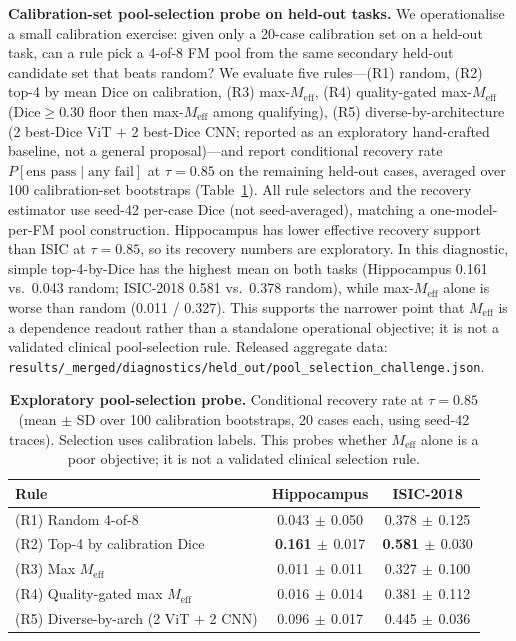 \textbf{Calibration-set pool-selection probe on held-out tasks.} We operationalise a small calibration exercise: given only a 20-case calibration set on a held-out task, can a rule pick a 4-of-8 FM pool from the same secondary held-out candidate set that beats random? We evaluate five rules---(R1) random, (R2) top-4 by mean Dice on calibration, (R3) max-$M_{\mathrm{eff}}$, (R4) quality-gated max-$M_{\mathrm{eff}}$ (Dice${\geq}0.30$ floor then max-$M_{\mathrm{eff}}$ among qualifying), (R5) diverse-by-architecture (2 best-Dice ViT $+$ 2 best-Dice CNN; reported as an exploratory hand-crafted baseline, not a general proposal)---and report conditional recovery rate $P[\text{ens pass}\mid\text{any fail}]$ at $\tau{=}0.85$ on the remaining held-out cases, averaged over 100 calibration-set bootstraps (Table~\ref{tab:pool-challenge}). All rule selectors and the recovery estimator use seed-42 per-case Dice (not seed-averaged), matching a one-model-per-FM pool construction. Hippocampus has lower effective recovery support than ISIC at $\tau{=}0.85$, so its recovery numbers are exploratory. In this diagnostic, simple top-4-by-Dice has the highest mean on both tasks (Hippocampus 0.161 vs.\ 0.043 random; ISIC-2018 0.581 vs.\ 0.378 random), while max-$M_{\mathrm{eff}}$ alone is worse than random (0.011 / 0.327). This supports the narrower point that $M_{\mathrm{eff}}$ is a dependence readout rather than a standalone operational objective; it is not a validated clinical pool-selection rule. Released aggregate data: \texttt{results/\_merged/diagnostics/held\_out/pool\_selection\_challenge.json}.

\begin{table}[!htbp]
  \caption{\textbf{Exploratory pool-selection probe.} Conditional recovery rate at $\tau{=}0.85$ (mean $\pm$ SD over 100 calibration bootstraps, 20 cases each, using seed-42 traces). Selection uses calibration labels. This probes whether $M_{\mathrm{eff}}$ alone is a poor objective; it is not a validated clinical selection rule.}
  \label{tab:pool-challenge}
  \centering\small
  \begin{tabular}{lcc}
    \toprule
    Rule & Hippocampus & ISIC-2018 \\
    \midrule
    (R1) Random 4-of-8                        & 0.043$\,\pm\,$0.050 & 0.378$\,\pm\,$0.125 \\
    (R2) Top-4 by calibration Dice            & \textbf{0.161}$\,\pm\,$0.017 & \textbf{0.581}$\,\pm\,$0.030 \\
    (R3) Max $M_{\mathrm{eff}}$                 & 0.011$\,\pm\,$0.011 & 0.327$\,\pm\,$0.100 \\
    (R4) Quality-gated max $M_{\mathrm{eff}}$   & 0.016$\,\pm\,$0.014 & 0.381$\,\pm\,$0.112 \\
    (R5) Diverse-by-arch (2 ViT $+$ 2 CNN)    & 0.096$\,\pm\,$0.017 & 0.445$\,\pm\,$0.036 \\
    \bottomrule
  \end{tabular}
\end{table}

